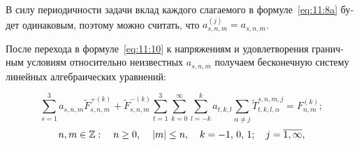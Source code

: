 \begin{russian}
%
%

В силу периодичности задачи вклад каждого слагаемого в формуле~\eqref{eq:11:8a} будет одинаковым, поэтому можно считать, что $a_{s,n,m}^{(j)}=a_{s,n,m}$.

После перехода в формуле~\eqref{eq:11:10} к напряжениям и удовлетворения граничным условиям относительно неизвестных $a_{s,n,m}$ получаем бесконечную систему линейных алгебраических уравнений:

\begin{equation}
\sum\limits_{s=1}^3 a_{s,n,m}\tilde F_{s,n,m}^{+(k)}+\tilde F_{s,n,m}^{-(k)}\sum\limits_{t=1}^3\sum\limits_{k=0}^\infty\sum\limits_{l=-k}^k a_{t,k,l}\sum\limits_{\alpha\neq j}\tilde T_{t,k,l,\alpha}^{s,n,m,j}=F_{n,m}^{(k)};
\label{eq:11:sys}
\end{equation}
$$
n,m \in\mathbb{Z}:\quad n \ge 0,{\mkern 1mu} \quad {\kern 1pt} |m| \le n,\quad {\mkern 1mu} k =  - 1,{\mkern 1mu} {\kern 1pt} 0,{\mkern 1mu} {\kern 1pt} 1;\;\;\;{\mkern 1mu} {\kern 1pt} j = \overline {1,\infty},
$$


\end{russian}
